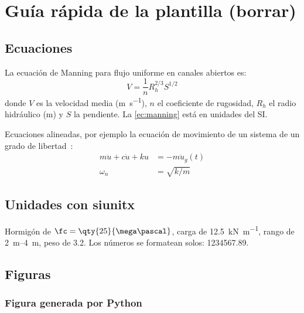 \chapter{Guía rápida de la plantilla (borrar)}
\label{anx:guia}

\section{Ecuaciones}
\label{sec:guia-ecuaciones}

La ecuación de Manning para flujo uniforme en canales abiertos es:
\begin{equation}
  V = \frac{1}{n} R_h^{2/3} S^{1/2}
  \label{ec:manning}
\end{equation}
donde $V$ es la velocidad media (\unit{\meter\per\second}), $n$ el coeficiente de rugosidad, $R_h$ el radio hidráulico (\unit{\meter}) y $S$ la pendiente.
La \cref{ec:manning} está en unidades del SI\@.

Ecuaciones alineadas, por ejemplo la ecuación de movimiento de un sistema de un grado de libertad~\parencite{suarez2014analisis}:
\begin{align}
  m\ddot{u} + c\dot{u} + k u &= -m\ddot{u}_g(t) \label{ec:eom}\\
  \omega_n &= \sqrt{k/m}
\end{align}

\section{Unidades con siunitx}

Hormigón de $\fc = \qty{25}{\mega\pascal}$, carga de \qty{12.5}{\kilo\newton\per\meter}, rango de \qtyrange{2}{4}{\meter}, peso de \qty{3.2}{\tonf}.
Los números se formatean solos: \num{1234567.89}.

\section{Figuras}

\subsection{Figura generada por Python}


